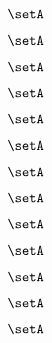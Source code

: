 \begin{forslides}
    \begin{equation}
        \label{eq:feedback-169}
        \setA
    \end{equation}

    \begin{equation}
        \label{eq:feedback-170}
        \setA
    \end{equation}

    \begin{equation}
        \label{eq:feedback-171}
        \setA
    \end{equation}

    \begin{equation}
        \label{eq:feedback-172}
        \setA
    \end{equation}

    \begin{equation}
        \label{eq:feedback-173}
        \setA
    \end{equation}

    \begin{equation}
        \label{eq:feedback-174}
        \setA
    \end{equation}

    \begin{equation}
        \label{eq:feedback-175}
        \setA
    \end{equation}

    \begin{equation}
        \label{eq:feedback-176}
        \setA
    \end{equation}

    \begin{equation}
        \label{eq:feedback-177}
        \setA
    \end{equation}

    \begin{equation}
        \label{eq:feedback-178}
        \setA
    \end{equation}

    \begin{equation}
        \label{eq:feedback-179}
        \setA
    \end{equation}

    \begin{equation}
        \label{eq:feedback-180}
        \setA
    \end{equation}

    \begin{equation}
        \label{eq:feedback-181}
        \setA
    \end{equation}


\end{forslides}
